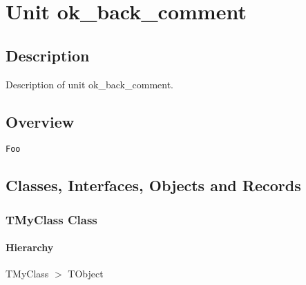 \documentclass{report}
\newif\ifpdf
\begin{document}
\label{toc}\tableofcontents
\newpage
\newlength{\tmplength}
\chapter{Unit ok{\_}back{\_}comment}
\label{ok_back_comment}
\section{Description}
Description of unit ok{\_}back{\_}comment.
\section{Overview}
\begin{description}
\item[\texttt{\begin{ttfamily}TMyClass\end{ttfamily} Class}]
\item[\texttt{\begin{ttfamily}TMyException1\end{ttfamily} Class}]
\item[\texttt{\begin{ttfamily}TMyException2\end{ttfamily} Class}]
\end{description}
\begin{description}
\item[\texttt{Foo}]
\end{description}
\section{Classes, Interfaces, Objects and Records}
\ifpdf
\subsection*{\large{\textbf{TMyClass Class}}\normalsize\hspace{1ex}\hrulefill}
\else
\subsection*{TMyClass Class}
\fi
\label{ok_back_comment.TMyClass}
\subsubsection*{\large{\textbf{Hierarchy}}\normalsize\hspace{1ex}\hfill}
TMyClass {$>$} TObject
\end{document}
